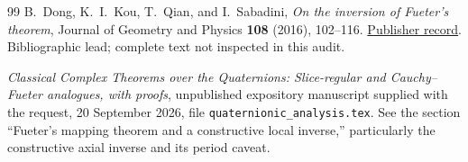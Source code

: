 \documentclass[11pt,a4paper]{article}
\numberwithin{equation}{section}
\theoremstyle{definition}
\theoremstyle{remark}
\begin{document}
\begin{thebibliography}{99}
B.~Dong, K.~I.~Kou, T.~Qian, and I.~Sabadini,
\emph{On the inversion of Fueter's theorem},
Journal of Geometry and Physics \textbf{108} (2016), 102--116.
\href{https://www.sciencedirect.com/science/article/pii/S0393044016301401}{Publisher record}.
Bibliographic lead; complete text not inspected in this audit.

\emph{Classical Complex Theorems over the Quaternions:
Slice-regular and Cauchy--Fueter analogues, with proofs},
unpublished expository manuscript supplied with the request,
20 September 2026, file \texttt{quaternionic\_analysis.tex}.
See the section ``Fueter's mapping theorem and a constructive local
inverse,'' particularly the constructive axial inverse and its period caveat.

\end{thebibliography}
\end{document}
